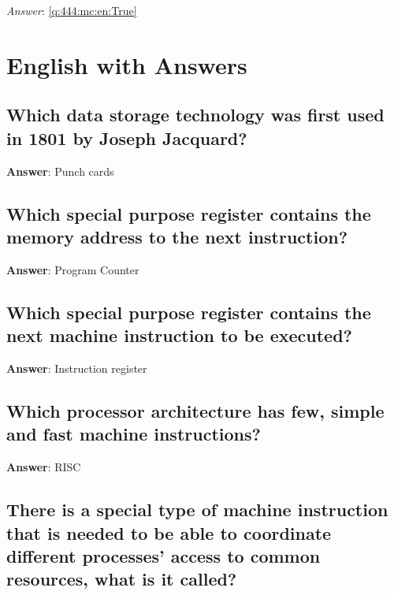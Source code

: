 \documentclass[a4paper,11pt,oneside]{article}
\begin{document}
\begin{sloppypar}
\vspace{1cm}

\textit{Answer}: \autoref{q:444:mc:en:True}

\section{English with Answers}
\label{englishWithAnswers}

\subsection{Which data storage technology was first used in 1801 by Joseph Jacquard?}

\label{q:3:sa:en:True}

\textbf{Answer}: Punch cards



\subsection{Which special purpose register contains the memory address to the next instruction?}

\label{q:4:sa:en:True}

\textbf{Answer}: Program Counter



\subsection{Which special purpose register contains the next machine instruction to be executed?}

\label{q:5:sa:en:True}

\textbf{Answer}: Instruction register



\subsection{Which processor architecture has few, simple and fast machine instructions?}

\label{q:6:sa:en:True}

\textbf{Answer}: RISC



\subsection{There is a special type of machine instruction that is needed to be able to coordinate different processes' access to common resources, what is it called?}


\end{sloppypar}
\end{document}
